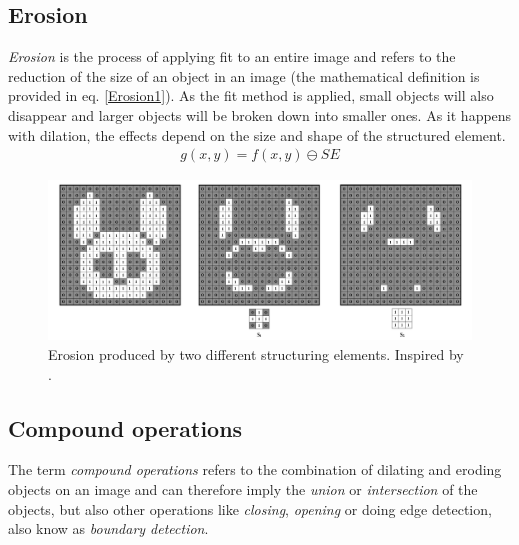 \subsection{Erosion}
\textit{Erosion} is the process of applying fit to an entire image and refers to the reduction of the size of an object in an image (the mathematical definition is provided in eq. \ref{Erosion1}). As the fit method is applied, small objects will also disappear and larger objects will be broken down into smaller ones. As it happens with dilation, the effects depend on the size and shape of the structured element.
\begin{equation}
\begin{aligned}
{g(x, y)}={f(x,y)}\ominus{SE}
\label{Erosion1}
	\end{aligned}
\end{equation}

\begin{figure}[htbp]
\centering
\includegraphics[width=1\textwidth]{Pictures/Theory/Erosion.png}
\caption{Erosion produced by two different structuring elements. Inspired by \citep{ip_book}.}
\label{fig:Erosion}
\end{figure}

\subsection{Compound operations}
The term \textit{compound operations} refers to the combination of dilating and eroding objects on an image and can therefore imply the \textit{union} or \textit{intersection} of the objects, but also other operations like \textit{closing}, \textit{opening} or doing edge detection, also know as \textit{boundary detection}.
